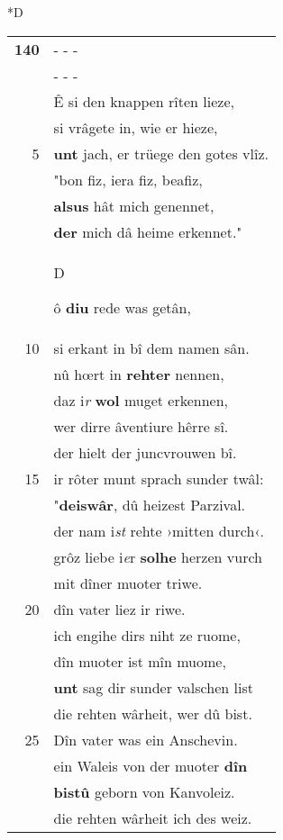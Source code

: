 \documentclass[8pt,a4paper,notitlepage]{article}
\begin{document}
\begin{table}[ht]
\begin{minipage}[t]{0.5\linewidth}
\small
\begin{center}*D
\end{center}
\begin{tabular}{rl}
\textbf{140} & \multicolumn{1}{l}{ - - - }\\ 
 & \multicolumn{1}{l}{ - - - }\\ 
 & Ê si den knappen rîten lieze,\\ 
 & si vrâgete in, wie er hieze,\\ 
5 & \textbf{unt} jach, er trüege den gotes vlîz.\\ 
 & "bon fiz, iera fiz, beafiz,\\ 
 & \textbf{alsus} hât mich genennet,\\ 
 & \textbf{der} mich dâ heime erkennet."\\ 
 & \begin{large}D\end{large}ô \textbf{diu} rede was getân,\\ 
10 & si erkant in bî dem namen sân.\\ 
 & nû hœrt in \textbf{rehter} nennen,\\ 
 & daz i\textit{r} \textbf{wol} muget erkennen,\\ 
 & wer dirre âventiure hêrre sî.\\ 
 & der hielt der juncvrouwen bî.\\ 
15 & ir rôter munt sprach sunder twâl:\\ 
 & "\textbf{deiswâr}, dû heizest Parzival.\\ 
 & der nam i\textit{st} rehte ›mitten durch‹.\\ 
 & grôz liebe i\textit{e}r \textbf{solhe} herzen vurch\\ 
 & mit dîner muoter triwe.\\ 
20 & dîn vater liez ir riwe.\\ 
 & ich engihe dirs niht ze ruome,\\ 
 & dîn muoter ist mîn muome,\\ 
 & \textbf{unt} sag dir sunder valschen list\\ 
 & die rehten wârheit, wer dû bist.\\ 
25 & Dîn vater was ein Anschevin.\\ 
 & ein Waleis von der muoter \textbf{dîn}\\ 
 & \textbf{bistû} geborn von Kanvoleiz.\\ 
 & die rehten wârheit ich des weiz.\\ 

\end{tabular}
\end{minipage}
\end{table}
\end{document}
